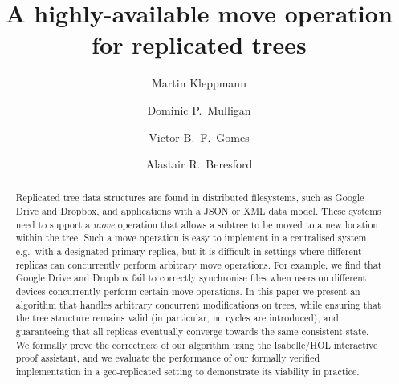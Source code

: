 \documentclass[sigplan,anonymous]{acmart}
\begin{document}
\title{A highly-available move operation for replicated trees}

\author{Martin Kleppmann}

\author{Dominic P.\ Mulligan}

\author{Victor B.\ F.\ Gomes}

\author{Alastair R.\ Beresford}


\begin{abstract}
    Replicated tree data structures are found in distributed filesystems, such as Google Drive and Dropbox, and applications with a JSON or XML data model.
    These systems need to support a \emph{move} operation that allows a subtree to be moved to a new location within the tree.
    Such a move operation is easy to implement in a centralised system, e.g.\ with a designated primary replica, but it is difficult in settings where different replicas can concurrently perform arbitrary move operations.
    For example, we find that Google Drive and Dropbox fail to correctly synchronise files when users on different devices concurrently perform certain move operations.
    In this paper we present an algorithm that handles arbitrary concurrent modifications on trees, while ensuring that the tree structure remains valid (in particular, no cycles are introduced), and guaranteeing that all replicas eventually converge towards the same consistent state.
    We formally prove the correctness of our algorithm using the Isabelle/HOL interactive proof assistant, and we evaluate the performance of our formally verified implementation in a geo-replicated setting to demonstrate its viability in practice.
\end{abstract}
\end{document}
